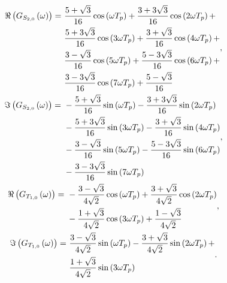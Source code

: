 \begin{gather}
\begin{split}
\Re \left( G_{S_{2,0}} \left(\omega\right) \right) = ~
& \frac{5 + \sqrt{3}}{16} \cos \left(\omega T_{p}\right) + \frac{3 + 3 \sqrt{3}}{16} \cos \left(2 \omega T_{p}\right) + \\
& \frac{5 + 3 \sqrt{3}}{16} \cos \left(3 \omega T_{p}\right) + \frac{3 + \sqrt{3}}{16} \cos \left(4 \omega T_{p}\right) + \\
& \frac{3 - \sqrt{3}}{16} \cos \left(5 \omega T_{p}\right) + \frac{5 - 3 \sqrt{3}}{16} \cos \left(6 \omega T_{p}\right) + \\
& \frac{3 - 3 \sqrt{3}}{16} \cos \left(7 \omega T_{p}\right) + \frac{5 - \sqrt{3}}{16}
\end{split}
\label{eq:sym_partd_output_trans_wn_re_S_2_0}, \\
\begin{split}
\Im \left( G_{S_{2,0}} \left(\omega\right) \right) = ~
& - \frac{5 + \sqrt{3}}{16} \sin \left(\omega T_{p}\right) - \frac{3 + 3 \sqrt{3}}{16} \sin \left(2 \omega T_{p}\right) \\
& - \frac{5 + 3 \sqrt{3}}{16} \sin \left(3 \omega T_{p}\right) - \frac{3 + \sqrt{3}}{16} \sin \left(4 \omega T_{p}\right) \\
& - \frac{3 - \sqrt{3}}{16} \sin \left(5 \omega T_{p}\right) - \frac{5 - 3 \sqrt{3}}{16} \sin \left(6 \omega T_{p}\right) \\
& - \frac{3 - 3 \sqrt{3}}{16} \sin \left(7 \omega T_{p}\right)
\end{split}
\label{eq:sym_partd_output_trans_wn_im_S_2_0}, \\
\begin{split}
\Re \left( G_{T_{1,0}} \left(\omega\right) \right) = ~
& - \frac{3 - \sqrt{3}}{4 \sqrt{2}} \cos \left(\omega T_{p}\right) + \frac{3 + \sqrt{3}}{4 \sqrt{2}} \cos \left(2 \omega T_{p}\right) \\
& - \frac{1 + \sqrt{3}}{4 \sqrt{2}} \cos \left(3 \omega T_{p}\right) + \frac{1 - \sqrt{3}}{4 \sqrt{2}}
\end{split}
\label{eq:sym_partd_output_trans_wn_re_T_1_0}, \\
\begin{split}
\Im \left( G_{T_{1,0}} \left(\omega\right) \right) = ~
& \frac{3 - \sqrt{3}}{4 \sqrt{2}} \sin \left(\omega T_{p}\right) - \frac{3 + \sqrt{3}}{4 \sqrt{2}} \sin \left(2 \omega T_{p}\right) + \\
& \frac{1 + \sqrt{3}}{4 \sqrt{2}} \sin \left(3 \omega T_{p}\right)
\end{split}
\label{eq:sym_partd_output_trans_wn_im_T_1_0}.
\end{gather}

